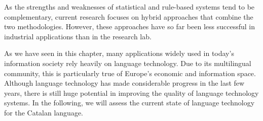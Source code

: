 \documentclass[]{../../metanetpaper}
\begin{document}
\begin{multicols}{2}
    As the strengths and weaknesses of statistical and rule-based systems tend to be complementary, current research focuses on hybrid approaches that combine the two methodologies. However, these approaches have so far been less successful in industrial applications than in the research lab. 

    As we have seen in this chapter, many applications widely used in today’s information society rely heavily on language technology. Due to its multilingual community, this is particularly true of Europe’s economic and information space. Although language technology has made considerable progress in the last few years, there is still huge potential in improving the quality of language technology systems. In the following, we will assess the current state of language technology for the Catalan language.
\end{multicols}

\clearpage

\end{document}

